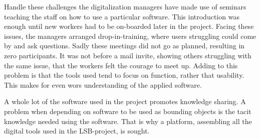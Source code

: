 Handle these challenges the digitalization managers have made use of seminars teaching the staff on how to use a particular software. This introduction was enough until new workers had to be on-boarded later in the project. Facing these issues, the managers arranged drop-in-training, where users struggling could come by and ask questions. Sadly these meetings did not go as planned, resulting in zero participants. It was not before a mail invite, showing others struggling with the same issue, that the workers felt the courage to meet up. Adding to this problem is that the tools used tend to focus on function, rather that usability. This makes for even wors understanding of the applied software.

A whole lot of the software used in the project promotes knowledge sharing. A problem when depending on software to be used as bounding objects is the tacit knowledge needed using the software. That is why a platform, assembling all the digital tools used in the LSB-project, is sought.

\cleardoublepage